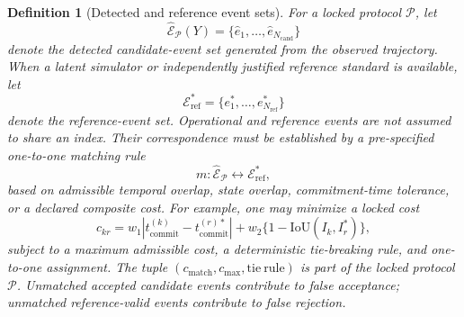 \documentclass[11pt,a4paper]{article}
\newtheorem{definition}{Definition}
\newcommand{\1}{\mathbf{1}}
\begin{document}
\begin{definition}[Detected and reference event sets]
For a locked protocol $\mathcal{P}$, let
\[
  \widehat{\mathcal{E}}_{\mathcal{P}}(Y)=\{\hat e_1,\ldots,\hat e_{N_{\mathrm{cand}}}\}
\]
denote the detected candidate-event set generated from the observed trajectory. When a latent simulator or independently justified reference standard is available, let
\[
  \mathcal{E}^{\ast}_{\mathrm{ref}}=\{e^{\ast}_1,\ldots,e^{\ast}_{N_{\mathrm{ref}}}\}
\]
denote the reference-event set. Operational and reference events are not assumed to share an index. Their correspondence must be established by a pre-specified one-to-one matching rule
\[
  m:\widehat{\mathcal{E}}_{\mathcal{P}}\leftrightarrow\mathcal{E}^{\ast}_{\mathrm{ref}},
\]
based on admissible temporal overlap, state overlap, commitment-time tolerance, or a declared composite cost. For example, one may minimize a locked cost
\[
  c_{kr}=w_1|t^{(k)}_{\mathrm{commit}}-t^{(r)\ast}_{\mathrm{commit}}|
  +w_2\{1-\mathrm{IoU}(I_k,I_r^\ast)\},
\]
subject to a maximum admissible cost, a deterministic tie-breaking rule, and one-to-one assignment. The tuple $(c_{\mathrm{match}},c_{\max},\mathrm{tie\ rule})$ is part of the locked protocol $\mathcal{P}$. Unmatched accepted candidate events contribute to false acceptance; unmatched reference-valid events contribute to false rejection.
\end{definition}
\end{document}
